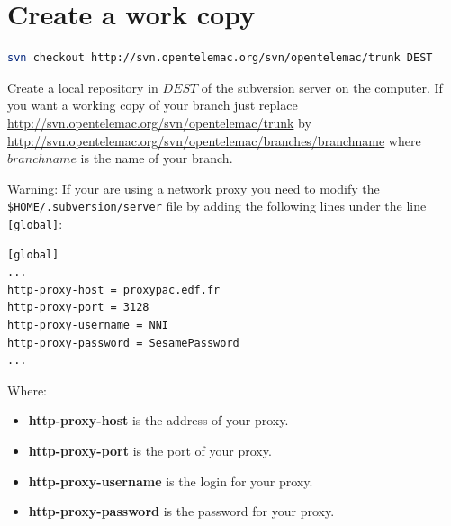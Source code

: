 \section{Create a work copy}
%
%
\begin{lstlisting}[language=bash]
svn checkout http://svn.opentelemac.org/svn/opentelemac/trunk DEST
\end{lstlisting}
Create a local repository in $DEST$ of the subversion server on the computer.
If you want a working copy of your branch just replace
\url{http://svn.opentelemac.org/svn/opentelemac/trunk} by
\url{http://svn.opentelemac.org/svn/opentelemac/branches/branchname} where
$branchname$ is the name of your branch.\\
%
\begin{WarningBlock}{Warning:}
If your are using a network proxy you need to modify the \verb"$HOME/.subversion/server"
file by adding the following lines under the line \verb"[global]":
\begin{lstlisting}[language=bash]
[global]
...
http-proxy-host = proxypac.edf.fr
http-proxy-port = 3128
http-proxy-username = NNI
http-proxy-password = SesamePassword
...
\end{lstlisting}
Where:
\begin{itemize}
\item \textbf{http-proxy-host} is the address of your proxy.
\item \textbf{http-proxy-port} is the port of your proxy.
\item \textbf{http-proxy-username} is the login for your proxy.
\item \textbf{http-proxy-password} is the password for your proxy.
\end{itemize}
\end{WarningBlock}
%
%
